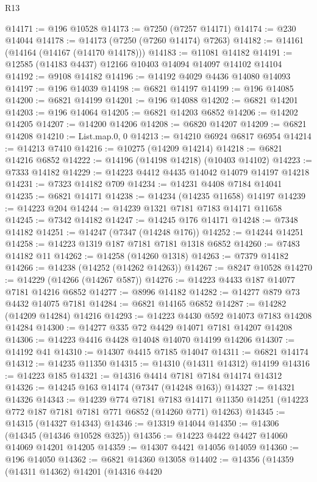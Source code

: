 \begin{lexlean}{R13}
\begin{coremodule}
@14171 := @196 @10528
@14173 := @7250 (@7257 @14171)
@14174 := @230 @14044
@14178 := @14173 (@7250 (@7260 @14174) @7263)
@14182 := @14161 (@14164 (@14167 (@14170 @14178)))
@14183 := @11081 @14182
@14191 := @12585 (@14183 @4437) @12166 @10403 @14094 @14097 @14102 @14104
@14192 := @9108 @14182
@14196 := @14192 @4029 @4436 @14080 @14093
@14197 := @196 @14039
@14198 := @6821 @14197
@14199 := @196 @14085
@14200 := @6821 @14199
@14201 := @196 @14088
@14202 := @6821 @14201
@14203 := @196 @14064
@14205 := @6821 @14203 @6852
@14206 := @14202 @14205
@14207 := @14200 @14206
@14208 := @6820 @14207
@14209 := @6821 @14208
@14210 := List.map.{0, 0}
@14213 := @14210 @6924 @6817 @6954
@14214 := @14213 @7410
@14216 := @10275 (@14209 @14214)
@14218 := @6821 @14216 @6852
@14222 := @14196 (@14198 @14218) (@10403 @14102)
@14223 := @7333 @14182
@14229 := @14223 @4412 @4435 @14042 @14079 @14197 @14218
@14231 := @7323 @14182 @709
@14234 := @14231 @4408 @7184 @14041
@14235 := @6821 @14171
@14238 := @14234 (@14235 @11658) @14197
@14239 := @14223 @204
@14244 := @14239 @1321 @7181 @7183 @14171 @11658
@14245 := @7342 @14182
@14247 := @14245 @176 @14171
@14248 := @7348 @14182
@14251 := @14247 (@7347 (@14248 @176))
@14252 := @14244 @14251
@14258 := @14223 @1319 @187 @7181 @7181 @1318 @6852
@14260 := @7483 @14182 @11
@14262 := @14258 (@14260 @1318)
@14263 := @7379 @14182
@14266 := @14238 (@14252 (@14262 @14263))
@14267 := @8247 @10528
@14270 := @14229 (@14266 (@14267 @587))
@14276 := @14223 @4433 @187 @14077 @7181 @14216 @6852
@14277 := @8996 @14182
@14282 := @14277 @879 @73 @4432 @14075 @7181
@14284 := @6821 @14165 @6852
@14287 := @14282 (@14209 @14284) @14216
@14293 := @14223 @4430 @592 @14073 @7183 @14208 @14284
@14300 := @14277 @335 @72 @4429 @14071 @7181 @14207 @14208
@14306 := @14223 @4416 @4428 @14048 @14070 @14199 @14206
@14307 := @14192 @41
@14310 := @14307 @4415 @7185 @14047
@14311 := @6821 @14174
@14312 := @14235 @11350
@14315 := @14310 (@14311 @14312) @14199
@14316 := @14223 @185
@14321 := @14316 @4414 @7181 @7184 @14174 @14312
@14326 := @14245 @163 @14174 (@7347 (@14248 @163))
@14327 := @14321 @14326
@14343 := @14239
    @774
    @7181
    @7183
    @14171
    @11350
    @14251
    (@14223 @772 @187 @7181 @7181 @771 @6852 (@14260 @771) @14263)
@14345 := @14315 (@14327 @14343)
@14346 := @13319 @14044
@14350 := @14306 (@14345 (@14346 @10528 @325))
@14356 := @14223 @4422 @4427 @14060 @14069 @14201 @14205
@14359 := @14307 @4421 @14056 @14059
@14360 := @196 @14050
@14362 := @6821 @14360 @13058
@14402 := @14356
    (@14359
      (@14311 @14362)
      @14201
      (@14316
        @4420

\end{coremodule}
\end{lexlean}
